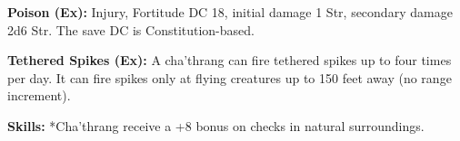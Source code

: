 \textbf{Poison (Ex):} Injury, Fortitude DC 18, initial damage 1 Str, secondary damage 2d6 Str. The save DC is Constitution-based.

\textbf{Tethered Spikes (Ex):} A cha'thrang can fire tethered spikes up to four times per day. It can fire spikes only at flying creatures up to 150 feet away (no range increment).

\textbf{Skills:} *Cha'thrang receive a +8 bonus on  checks in natural surroundings.
